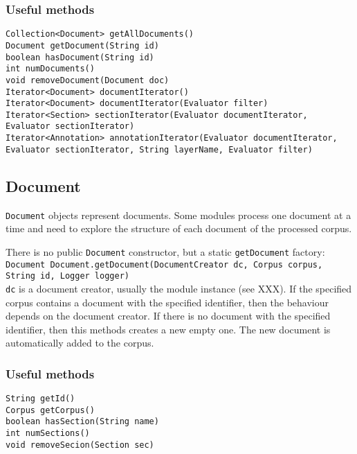 \documentclass[a4paper]{article}
\begin{document}
\subsubsection{Useful methods}

\texttt{Collection<Document> getAllDocuments()}\\
\texttt{Document getDocument(String id)}\\
\texttt{boolean hasDocument(String id)}\\
\texttt{int numDocuments()}\\
\texttt{void removeDocument(Document doc)}\\

\texttt{Iterator<Document> documentIterator()}\\
\texttt{Iterator<Document> documentIterator(Evaluator filter)}\\
\texttt{Iterator<Section> sectionIterator(Evaluator documentIterator, Evaluator sectionIterator)}\\
\texttt{Iterator<Annotation> annotationIterator(Evaluator documentIterator, Evaluator sectionIterator, String layerName, Evaluator filter)}

\subsection{Document}
\texttt{Document} objects represent documents.
Some modules process one document at a time and need to explore the structure of each document of the processed corpus.

There is no public \texttt{Document} constructor, but a static \texttt{getDocument} factory:
\texttt{Document Document.getDocument(DocumentCreator dc, Corpus corpus, String id, Logger logger)}\\
\texttt{dc} is a document creator, usually the module instance (see XXX).
If the specified corpus contains a document with the specified identifier, then the behaviour depends on the document creator.
If there is no document with the specified identifier, then this methods creates a new empty one.
The new document is automatically added to the corpus.

\subsubsection{Useful methods}

\texttt{String getId()}\\
\texttt{Corpus getCorpus()}\\
\texttt{boolean hasSection(String name)}\\
\texttt{int numSections()}\\
\texttt{void removeSecion(Section sec)}\\
\end{document}

